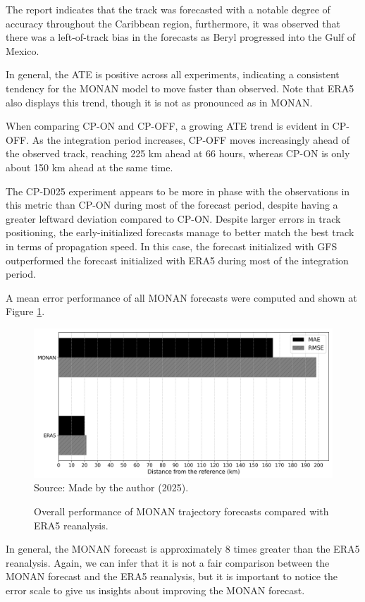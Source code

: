 The report \cite{metoffice2024} indicates that the track was forecasted with a notable degree of accuracy throughout the Caribbean region, furthermore, it was observed that there was a left-of-track bias in the forecasts as Beryl progressed into the Gulf of Mexico.

In general, the ATE is positive across all experiments, indicating a consistent tendency for the MONAN model to move faster than observed. Note that ERA5 also displays this trend, though it is not as pronounced as in MONAN.

When comparing CP-ON and CP-OFF, a growing ATE trend is evident in CP-OFF. As the integration period increases, CP-OFF moves increasingly ahead of the observed track, reaching 225 km ahead at 66 hours, whereas CP-ON is only about 150 km ahead at the same time.

The CP-D025 experiment appears to be more in phase with the observations in this metric than CP-ON during most of the forecast period, despite having a greater leftward deviation compared to CP-ON. Despite larger errors in track positioning, the early-initialized forecasts manage to better match the best track in terms of propagation speed. In this case, the forecast initialized with GFS outperformed the forecast initialized with ERA5 during most of the integration period.

A mean error performance of all MONAN forecasts were computed and shown at Figure \ref{fig:monera5}.

\begin{figure}[!ht]
	\centering
	\caption{Overall performance of MONAN trajectory forecasts compared with ERA5 reanalysis.} %
	\includegraphics[width=\textwidth]{docs/figuras/chapter5/barplot_monan_vs_era5_mae_rmse_FINAL.png} 
	\vspace{0.5em}
	Source: Made by the author (2025).  %
	\label{fig:monera5} %
\end{figure}

In general, the MONAN forecast is approximately 8 times greater than the ERA5 reanalysis. Again, we can infer that it is not a fair comparison between the MONAN forecast and the ERA5 reanalysis, but it is important to notice the error scale to give us insights about improving the MONAN forecast.



